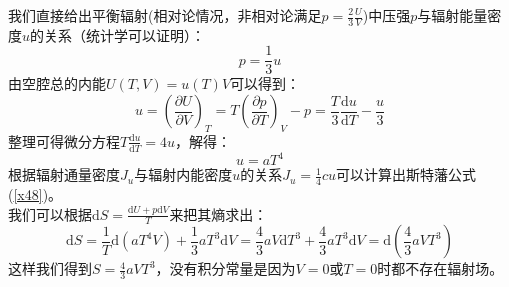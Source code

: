 \documentclass[12pt]{article}
\begin{document}
我们直接给出平衡辐射(相对论情况，非相对论满足$p=\frac{2}{3}\frac{U}{V}$)中压强$p$与辐射能量密度$u$的关系（统计学可以证明）：
\begin{equation}
	p=\frac{1}{3}u
	\label{x11}
\end{equation}
由空腔总的内能$U(T,V)=u(T)V$可以得到：
\begin{equation}
	u=(\frac{\partial U}{\partial V})_T=T(\frac{\partial p}{\partial T})_V-p=\frac{T}{3}\frac{\mathrm{d} u}{\mathrm{d}T}-\frac{u}{3}
\end{equation}
整理可得微分方程$T\frac{\mathrm{d}u}{\mathrm{d}T}=4u$，解得：
\begin{equation}
	u=aT^4
\end{equation}
根据辐射通量密度$J_u$与辐射内能密度$u$的关系$J_u=\frac{1}{4}cu$可以计算出斯特藩公式(\ref{x48})。\\
我们可以根据$\mathrm{d}S=\frac{\mathrm{d}U+p\mathrm{d}V}{T}$来把其熵求出：
\begin{equation}
	\mathrm{d}S=\frac{1}{T}\mathrm{d}(aT^4V)+\frac{1}{3}aT^3\mathrm{d}V=\frac{4}{3}aV\mathrm{d}T^3+\frac{4}{3}aT^3\mathrm{d}V=\mathrm{d}(\frac{4}{3}aVT^3)
\end{equation}
这样我们得到$S=\frac{4}{3}aVT^3$，没有积分常量是因为$V=0$或$T=0$时都不存在辐射场。\\
\end{document}
